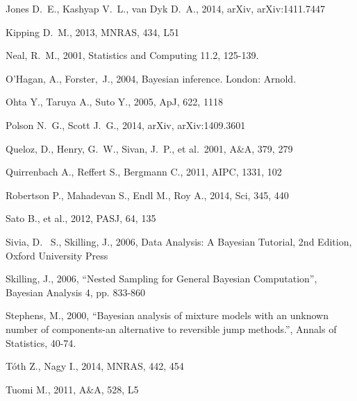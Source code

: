 \documentclass[useAMS,usenatbib]{mn2e}
\begin{document}
\begin{thebibliography}{99}
 Jones D.~E., Kashyap V.~L., van Dyk D.~A., 2014, arXiv, arXiv:1411.7447 

Kipping D.~M., 2013, MNRAS, 434, L51 

Neal, R.~M., 2001, Statistics and Computing 11.2, 125-139.

O'Hagan, A., Forster,~J., 2004, Bayesian inference. London: Arnold.

 Ohta Y., Taruya A., Suto Y., 2005, ApJ, 622, 1118

 Polson N.~G., Scott J.~G., 2014, arXiv, arXiv:1409.3601

 Queloz, D., Henry, G.~W., Sivan, J.~P., et al.\ 2001, A\&A, 379, 279 

 Quirrenbach A., Reffert S., Bergmann C., 2011, AIPC, 1331, 102 

 Robertson P., Mahadevan S., Endl M., Roy 
A., 2014, Sci, 345, 440 

Sato B., et al., 2012, PASJ, 64, 135 

 Sivia, 
D.~ S., Skilling, J., 2006, Data Analysis: A Bayesian Tutorial, 2nd 
Edition, Oxford University Press

 Skilling, 
J., 2006, ``Nested Sampling for General Bayesian Computation'', Bayesian 
Analysis 4, pp. 833-860

 Stephens, M., 2000, ``Bayesian analysis of mixture models with an unknown number of components-an alternative to reversible jump methods.'', Annals of Statistics, 40-74.

 T{\'o}th Z., Nagy I., 2014, MNRAS, 442, 454 

 Tuomi M., 2011, A\&A, 528, L5 


\end{thebibliography}
\end{document}

